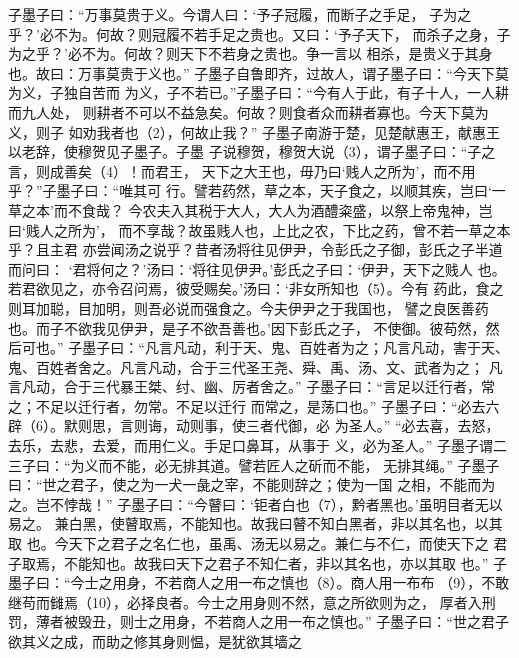 \documentclass[12pt,UTF8]{ctexbook}
\begin{document}
子墨子曰：“万事莫贵于义。今谓人曰：‘予子冠履，而断子之手足， 
子为之乎？’必不为。何故？则冠履不若手足之贵也。又曰：‘予子天下， 
而杀子之身，子为之乎？’必不为。何故？则天下不若身之贵也。争一言以 
相杀，是贵义于其身也。故曰：万事莫贵于义也。” 
子墨子自鲁即齐，过故人，谓子墨子曰：“今天下莫为义，子独自苦而 
为义，子不若已。”子墨子曰：“今有人于此，有子十人，一人耕而九人处， 
则耕者不可以不益急矣。何故？则食者众而耕者寡也。今天下莫为义，则子 
如劝我者也（2），何故止我？” 
子墨子南游于楚，见楚献惠王，献惠王以老辞，使穆贺见子墨子。子墨 
子说穆贺，穆贺大说（3），谓子墨子曰：“子之言，则成善矣（4）！而君王， 
天下之大王也，毋乃曰‘贱人之所为’，而不用乎？”子墨子曰：“唯其可 
行。譬若药然，草之本，天子食之，以顺其疾，岂曰‘一草之本’而不食哉？ 
今农夫入其税于大人，大人为酒醴粢盛，以祭上帝鬼神，岂曰‘贱人之所为’， 
而不享哉？故虽贱人也，上比之农，下比之药，曾不若一草之本乎？且主君 
亦尝闻汤之说乎？昔者汤将往见伊尹，令彭氏之子御，彭氏之子半道而问曰： 
‘君将何之？’汤曰：‘将往见伊尹。’彭氏之子曰：‘伊尹，天下之贱人 
也。若君欲见之，亦令召问焉，彼受赐矣。’汤曰：‘非女所知也（5）。今有 
药此，食之则耳加聪，目加明，则吾必说而强食之。今夫伊尹之于我国也， 
譬之良医善药也。而子不欲我见伊尹，是子不欲吾善也。’因下彭氏之子， 
不使御。彼苟然，然后可也。” 
子墨子曰：“凡言凡动，利于天、鬼、百姓者为之；凡言凡动，害于天、 
鬼、百姓者舍之。凡言凡动，合于三代圣王尧、舜、禹、汤、文、武者为之； 
凡言凡动，合于三代暴王桀、纣、幽、厉者舍之。” 
子墨子曰：“言足以迁行者，常之；不足以迁行者，勿常。不足以迁行 
而常之，是荡口也。” 
子墨子曰：“必去六辟（6）。默则思，言则诲，动则事，使三者代御，必 
为圣人。” 
“必去喜，去怒，去乐，去悲，去爱，而用仁义。手足口鼻耳，从事于 
义，必为圣人。” 
子墨子谓二三子曰：“为义而不能，必无排其道。譬若匠人之斫而不能， 
无排其绳。” 
子墨子曰：“世之君子，使之为一犬一彘之宰，不能则辞之；使为一国 
之相，不能而为之。岂不悖哉！” 
子墨子曰：“今瞽曰：‘钜者白也（7），黔者黑也。’虽明目者无以易之。 
兼白黑，使瞽取焉，不能知也。故我曰瞽不知白黑者，非以其名也，以其取 
也。今天下之君子之名仁也，虽禹、汤无以易之。兼仁与不仁，而使天下之 
君子取焉，不能知也。故我曰天下之君子不知仁者，非以其名也，亦以其取 
也。” 
子墨子曰：“今士之用身，不若商人之用一布之慎也（8）。商人用一布布 
（9），不敢继苟而雠焉（10），必择良者。今士之用身则不然，意之所欲则为之， 
厚者入刑罚，薄者被毁丑，则士之用身，不若商人之用一布之慎也。” 
子墨子曰：“世之君子欲其义之成，而助之修其身则愠，是犹欲其墙之 
\end{document}
